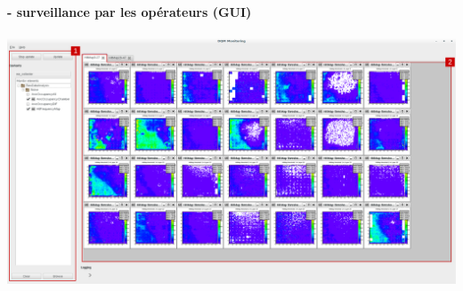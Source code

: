 \documentclass[8pt]{beamer}
\begin{document}

    \begin{frame}
    \frametitle{\secname}
    \framesubtitle{\subsecname - surveillance par les opérateurs (GUI)}
      \begin{center}
        \includegraphics[width=\linewidth]{MonitoringMainWindowGui.pdf}
      \end{center}
    \end{frame}
\end{document}
